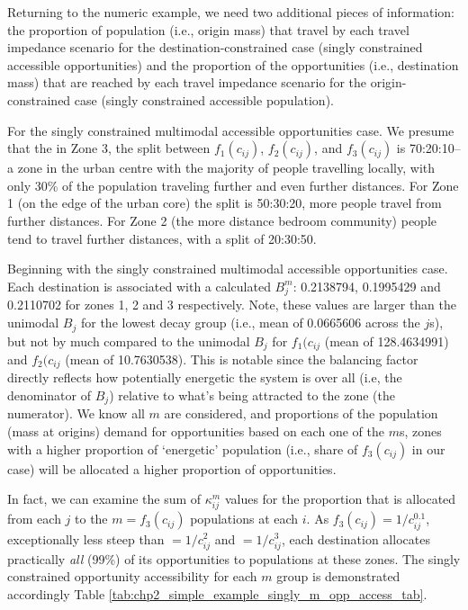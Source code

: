 \documentclass[
11pt, %
oneside, %
english, %
singlespacing, %
]{macthesis} %
\begin{document}
Returning to the numeric example, we need two additional pieces of information: the proportion of population (i.e., origin mass) that travel by each travel impedance scenario for the destination-constrained case (singly constrained accessible opportunities) and the proportion of the opportunities (i.e., destination mass) that are reached by each travel impedance scenario for the origin-constrained case (singly constrained accessible population).

For the singly constrained multimodal accessible opportunities case. We presume that the in Zone 3, the split between \(f_1(c_{ij})\), \(f_2(c_{ij})\), and \(f_3(c_{ij})\) is 70:20:10--a zone in the urban centre with the majority of people travelling locally, with only 30\% of the population traveling further and even further distances. For Zone 1 (on the edge of the urban core) the split is 50:30:20, more people travel from further distances. For Zone 2 (the more distance bedroom community) people tend to travel further distances, with a split of 20:30:50.

Beginning with the singly constrained multimodal accessible opportunities case. Each destination is associated with a calculated \(B_j^m\): 0.2138794, 0.1995429 and 0.2110702 for zones 1, 2 and 3 respectively. Note, these values are larger than the unimodal \(B_j\) for the lowest decay group (i.e., mean of 0.0665606 across the \(j\)s), but not by much compared to the unimodal \(B_j\) for \(f_1(c_{ij}\) (mean of 128.4634991) and \(f_2(c_{ij}\) (mean of 10.7630538). This is notable since the balancing factor directly reflects how potentially energetic the system is over all (i.e, the denominator of \(B_j\)) relative to what's being attracted to the zone (the numerator). We know all \(m\) are considered, and proportions of the population (mass at origins) demand for opportunities based on each one of the \(m\)s, zones with a higher proportion of `energetic' population (i.e., share of \(f_3(c_{ij})\) in our case) will be allocated a higher proportion of opportunities.

In fact, we can examine the sum of \(\kappa_{ij}^m\) values for the proportion that is allocated from each \(j\) to the \(m = f_3(c_{ij})\) populations at each \(i\). As \(f_3(c_{ij}) = 1/c_{ij}^0.1\), exceptionally less steep than \(= 1/c_{ij}^2\) and \(= 1/c_{ij}^3\), each destination allocates practically \emph{all} (99\%) of its opportunities to populations at these zones. The singly constrained opportunity accessibility for each \(m\) group is demonstrated accordingly Table \ref{tab:chp2_simple_example_singly_m_opp_access_tab}.
\end{document}
